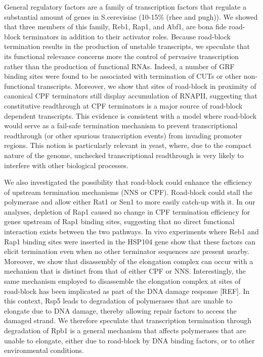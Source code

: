 General regulatory factors are a family of transcription factors that regulate a substantial amount of genes in S.cerevisiae (10-15\% (rhee and pugh)). 
We showed that three members of this family, Reb1, Rap1, and Abf1, are bona fide road-block terminators in addition to their activator roles. 
Because road-block termination results in the production of unstable transcripts, we speculate that its functional relevance concerns more the control of pervasive transcription rather than the production of functional RNAs. 
Indeed, a number of GRF binding sites were found to be associated with termination of CUTs or other non-functional transcripts. 
Moreover, we show that sites of road-block in proximity of canonical CPF terminators still display accumulation of RNAPII, suggesting that constitutive readthrough at CPF terminators is a major source of road-block dependent transcripts. 
This evidence is consistent with a model where road-block would serve as a fail-safe termination mechanism to prevent transcriptional readthrough (or other spurious transcription events) from invading promoter regions. 
This notion is particularly relevant in yeast, where, due to the compact nature of the genome, unchecked transcriptional readthrough is very likely to interfere with other biological processes.  


We also investigated the possibility that road-block could enhance the efficiency of upstream termination mechanisms (NNS or CPF). 
Road-block could stall the polymerase and allow either Rat1 or Sen1 to more easily catch-up with it. 
In our analyses, depletion of Rap1 caused no change in CPF termination efficiency for genes upstream of Rap1 binding sites, suggesting that no direct functional interaction exists between the two pathways. 
In vivo experiments where Reb1 and Rap1 binding sites were inserted in the HSP104 gene show that these factors can elicit termination even when no other terminator sequences are present nearby. 
Moreover, we show that disassembly of the elongation complex can occur with a mechanism that is distinct from that of either CPF or NNS. 
Interestingly, the same mechanism employed to disassemble the elongation complex at sites of road-block has been implicated as part of the DNA damage response [REF]. 
In this context, Rsp5 leads to degradation of polymerases that are unable to elongate due to DNA damage, thereby allowing repair factors to access the damaged strand. 
We therefore speculate that transcription termination through degradation of Rpb1 is a general mechanism that affects polymerases that are unable to elongate, either due to road-block by DNA binding factors, or to other environmental conditions.

